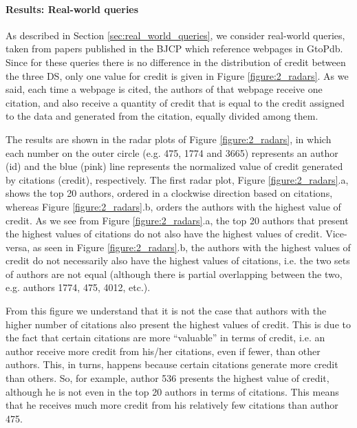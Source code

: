 \paragraph{Results: Real-world queries}
As described in Section \ref{sec:real_world_queries}, we consider real-world queries, taken from papers published in the BJCP which reference webpages in GtoPdb.
Since for these queries there is no difference in the distribution of credit between the three DS, only one value for credit is given in Figure \ref{figure:2_radars}. As we said, each time a webpage is cited, the authors of that webpage receive one citation, and also receive a quantity of credit that is equal to the credit assigned to the data and generated from the citation, equally divided among them. 

The results are shown in the radar plots of Figure \ref{figure:2_radars}, in which each number on the outer circle (e.g. 475, 1774 and 3665) represents an author (id) and the blue (pink) line represents the normalized value of credit generated by citations (credit), respectively. The first radar plot,
Figure \ref{figure:2_radars}.a, shows the top 20 authors, ordered in a clockwise direction based on citations, whereas Figure \ref{figure:2_radars}.b, orders the authors with the highest value of credit. 
As we see from Figure \ref{figure:2_radars}.a, the top 20 authors that present the highest values of citations do not also have the highest values of credit. Vice-versa, as seen in Figure \ref{figure:2_radars}.b, the authors with the highest values of credit do not necessarily also have the highest values of citations, i.e. the two sets of authors are not equal (although there is partial overlapping between the two, e.g. authors 1774, 475, 4012, etc.). 

From this figure we understand that it is not the case that authors with the higher number of citations also present the highest values of credit. This is due to the fact that certain citations are more ``valuable'' in terms of credit, i.e. an author receive more credit from his/her citations, even if fewer, than other authors. This, in turns, happens because certain citations generate more credit than others. 
So, for example, author 536 presents the highest value of credit, although he is not even in the top 20 authors in terms of citations. This means that he receives much more credit from his relatively few citations than author 475. 

